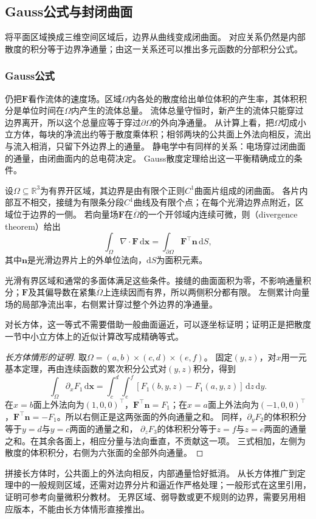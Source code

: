 \subsection{Gauss公式与封闭曲面}

将平面区域换成三维空间区域后，边界从曲线变成闭曲面。
对应关系仍然是内部散度的积分等于边界净通量；由这一关系还可以推出多元函数的分部积分公式。

\subsubsection{Gauss公式}

仍把$\bm F$看作流体的速度场。区域$\Omega$内各处的散度给出单位体积的产生率，其体积积分是单位时间在$\Omega$内产生的流体总量。
流体总量守恒时，新产生的流体只能穿过边界离开，所以这个总量应等于穿过$\partial\Omega$的外向净通量。
从计算上看，把$\Omega$切成小立方体，每块的净流出约等于散度乘体积；相邻两块的公共面上外法向相反，流出与流入相消，只留下外边界上的通量。
静电学中有同样的关系：电场穿过闭曲面的通量，由闭曲面内的总电荷决定。
Gauss散度定理给出这一平衡精确成立的条件。
\begin{theorem}[Gauss散度定理]
\label{thm:analysis-divergence-theorem}
设$\Omega\subseteq\mathbb R^3$为有界开区域，其边界是由有限个正则$C^1$曲面片组成的闭曲面。
各片内部互不相交，接缝为有限条分段$C^1$曲线及有限个点；在每个光滑边界点附近，区域位于边界的一侧。
若向量场$\bm F$在$\overline\Omega$的一个开邻域内连续可微，则（divergence theorem）给出
\begin{equation}
  \int_{\Omega}\nabla\mathbin{\cdot}\bm F\,\mathrm d\bm x
  =\int_{\partial\Omega}\bm F^\top\bm n\,\mathrm dS,
 \label{eq:analysis-divergence-theorem}
\end{equation}
其中$\bm n$是光滑边界片上的外单位法向，$\mathrm dS$为面积元素。
\end{theorem}
光滑有界区域和通常的多面体满足这些条件。接缝的曲面面积为零，不影响通量积分；$\bm F$及其偏导数在紧集$\overline\Omega$上连续因而有界，所以两侧积分都有限。
左侧累计向量场的局部净流出率，右侧累计穿过整个外边界的净通量。

对长方体，这一等式不需要借助一般曲面逼近，可以逐坐标证明；证明正是把散度一节中小立方体上的近似计算改写成精确等式。
\begin{proof}[长方体情形的证明]
取$\Omega=(a,b)\times(c,d)\times(e,f)$。
固定$(y,z)$，对$x$用一元基本定理，再由连续函数的累次积分公式对$(y,z)$积分，得到
\[
 \int_\Omega\partial_xF_1\,\mathrm d\bm x
 =\int_c^d\int_e^f
   [F_1(b,y,z)-F_1(a,y,z)]\,\mathrm dz\,\mathrm dy.
\]
在$x=b$面上外法向为$(1,0,0)^\top$，$\bm F^\top\bm n=F_1$；在$x=a$面上外法向为$(-1,0,0)^\top$，$\bm F^\top\bm n=-F_1$。所以右侧正是这两张面的外向通量之和。
同样，$\partial_yF_2$的体积积分等于$y=d$与$y=c$两面的通量之和，
$\partial_zF_3$的体积积分等于$z=f$与$z=e$两面的通量之和。在其余各面上，相应分量与法向垂直，不贡献这一项。
三式相加，左侧为散度的体积积分，右侧为六张面的全部外向通量。
\end{proof}
拼接长方体时，公共面上的外法向相反，内部通量恰好抵消。
从长方体推广到定理中的一般规则区域，还需对边界分片和逼近作严格处理；一般形式在这里引用，证明可参考向量微积分教材。
无界区域、弱导数或更不规则的边界，需要另用相应版本，不能由长方体情形直接推出。


